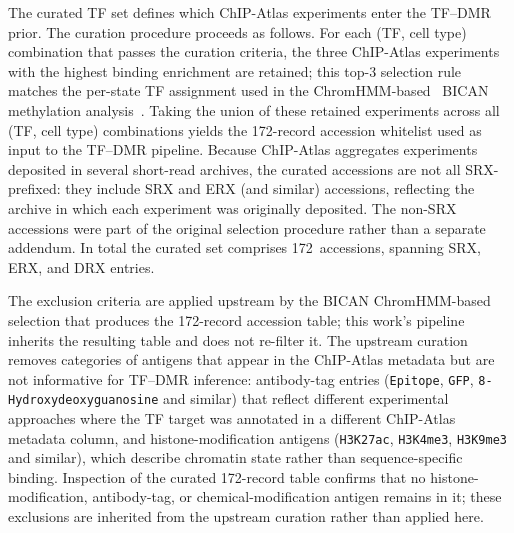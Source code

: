 \documentclass[sigconf,nonacm]{acmart}
\begin{document}
The curated TF set defines which ChIP-Atlas experiments enter the
TF--DMR prior. The curation procedure proceeds as follows. For each
(TF, cell type) combination that passes the curation criteria, the
three ChIP-Atlas experiments with the highest binding
enrichment are retained; this top-3 selection rule matches the
per-state TF assignment used
in the ChromHMM-based~\cite{ernst2017chromhmm} BICAN methylation
analysis~\cite{bican2026manuscript}. Taking the union of these
retained experiments across all (TF, cell type) combinations yields
the 172-record accession whitelist used as input to the TF--DMR
pipeline.
Because ChIP-Atlas aggregates experiments deposited in several
short-read archives, the curated accessions are not all
SRX-prefixed: they include SRX and ERX (and similar) accessions,
reflecting the archive in which each experiment was originally
deposited. The non-SRX accessions were part of the original
selection procedure rather than a separate addendum. In total the
curated set comprises 172~accessions, spanning SRX, ERX, and DRX
entries.

The exclusion criteria are applied upstream by the BICAN
ChromHMM-based selection that produces the 172-record accession
table; this work's pipeline inherits the resulting table and does not
re-filter it. The upstream curation removes categories of antigens
that appear in the ChIP-Atlas metadata but are not informative for
TF--DMR inference: antibody-tag entries (\texttt{Epitope},
\texttt{GFP}, \texttt{8-Hydroxydeoxyguanosine} and similar) that
reflect different experimental approaches where the TF target was
annotated in a different ChIP-Atlas metadata column, and
histone-modification antigens (\texttt{H3K27ac}, \texttt{H3K4me3},
\texttt{H3K9me3} and similar), which describe chromatin state rather
than sequence-specific binding. Inspection of the curated 172-record
table confirms that no histone-modification, antibody-tag, or
chemical-modification antigen remains in it; these exclusions are
inherited from the upstream curation rather than applied here.
\end{document}
